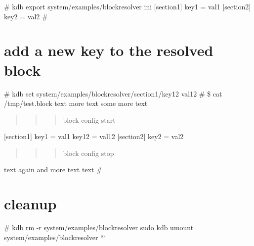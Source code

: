 \# kdb export system/examples/blockresolver ini \mbox{[}section1\mbox{]} key1 = val1 \mbox{[}section2\mbox{]} key2 = val2 \# \section*{add a new key to the resolved block}

\# kdb set system/examples/blockresolver/section1/key12 val12 \# \$ cat /tmp/test.block text more text some more text \begin{quote}
\begin{quote}
\begin{quote}
block config start \end{quote}
\end{quote}
\end{quote}
\mbox{[}section1\mbox{]} key1 = val1 key12 = val12 \mbox{[}section2\mbox{]} key2 = val2 \begin{quote}
\begin{quote}
\begin{quote}
block config stop \end{quote}
\end{quote}
\end{quote}
text again and more text text \# \section*{cleanup}

\# kdb rm -\/r system/examples/blockresolver sudo kdb umount system/examples/blockresolver ``` 
